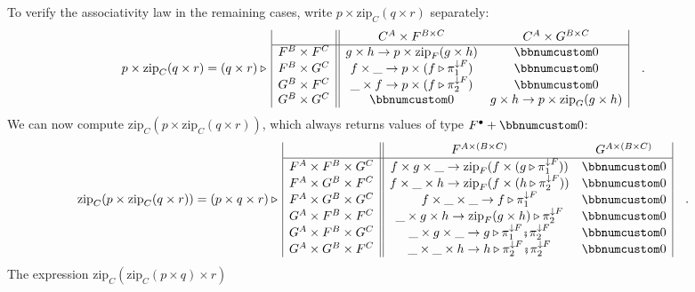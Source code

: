 To verify the associativity law in the remaining cases, write $p\times\text{zip}_{C}(q\times r)$
separately:
\begin{align*}
 & p\times\text{zip}_{C}(q\times r)=(q\times r)\triangleright\,\begin{array}{|c||cc|}
 & C^{A}\times F^{B\times C} & C^{A}\times G^{B\times C}\\
\hline F^{B}\times F^{C} & g\times h\rightarrow p\times\text{zip}_{F}(g\times h) & \bbnum 0\\
F^{B}\times G^{C} & f\times\_\rightarrow p\times(f\triangleright\pi_{1}^{\downarrow F}) & \bbnum 0\\
G^{B}\times F^{C} & \_\times f\rightarrow p\times(f\triangleright\pi_{2}^{\downarrow F}) & \bbnum 0\\
G^{B}\times G^{C} & \bbnum 0 & g\times h\rightarrow p\times\text{zip}_{G}(g\times h)
\end{array}\quad.
\end{align*}
We can now compute $\text{zip}_{C}(p\times\text{zip}_{C}(q\times r))$,
which always returns values of type $F^{\bullet}+\bbnum 0$:
\begin{align*}
 & \text{zip}_{C}(p\times\text{zip}_{C}(q\times r))=(p\times q\times r)\triangleright\,\begin{array}{|c||cc|}
 & F^{A\times(B\times C)} & G^{A\times(B\times C)}\\
\hline F^{A}\times F^{B}\times G^{C} & f\times g\times\_\rightarrow\text{zip}_{F}(f\times(g\triangleright\pi_{1}^{\downarrow F})) & \bbnum 0\\
F^{A}\times G^{B}\times F^{C} & f\times\_\times h\rightarrow\text{zip}_{F}(f\times(h\triangleright\pi_{2}^{\downarrow F})) & \bbnum 0\\
F^{A}\times G^{B}\times G^{C} & f\times\_\times\_\rightarrow f\triangleright\pi_{1}^{\downarrow F} & \bbnum 0\\
G^{A}\times F^{B}\times F^{C} & \_\times g\times h\rightarrow\text{zip}_{F}(g\times h)\triangleright\pi_{2}^{\downarrow F} & \bbnum 0\\
G^{A}\times F^{B}\times G^{C} & \_\times g\times\_\rightarrow g\triangleright\pi_{1}^{\downarrow F}\bef\pi_{2}^{\downarrow F} & \bbnum 0\\
G^{A}\times G^{B}\times F^{C} & \_\times\_\times h\rightarrow h\triangleright\pi_{2}^{\downarrow F}\bef\pi_{2}^{\downarrow F} & \bbnum 0
\end{array}\quad.
\end{align*}
The expression $\text{zip}_{C}(\text{zip}_{C}(p\times q)\times r)$
